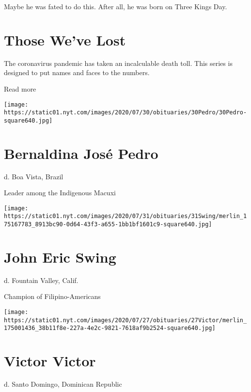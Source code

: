 Maybe he was fated to do this. After all, he was born on Three Kings
Day.

\href{https://www.nytimes.com/interactive/2020/obituaries/people-died-coronavirus-obituaries.html?action=click\&pgtype=Article\&state=default\&region=BELOW_MAIN_CONTENT\&context=covid_obits_promo}{}

\hypertarget{those-weve-lost}{%
\section{Those We've Lost}\label{those-weve-lost}}

The coronavirus pandemic has taken an incalculable death toll. This
series is designed to put names and faces to the numbers.

Read more

\texttt{[image: https://static01.nyt.com/images/2020/07/30/obituaries/30Pedro/30Pedro-square640.jpg]}

\hypertarget{bernaldina-josuxe9-pedro}{%
\section{Bernaldina José Pedro}\label{bernaldina-josuxe9-pedro}}

d. Boa Vista, Brazil

Leader among the Indigenous Macuxi

\texttt{[image: https://static01.nyt.com/images/2020/07/31/obituaries/31Swing/merlin\_175167783\_8913bc90-0d64-43f3-a655-1bb1bf1601c9-square640.jpg]}

\hypertarget{john-eric-swing}{%
\section{John Eric Swing}\label{john-eric-swing}}

d. Fountain Valley, Calif.

Champion of Filipino-Americans

\texttt{[image: https://static01.nyt.com/images/2020/07/27/obituaries/27Victor/merlin\_175001436\_38b11f8e-227a-4e2c-9821-7618af9b2524-square640.jpg]}

\hypertarget{victor-victor}{%
\section{Victor Victor}\label{victor-victor}}

d. Santo Domingo, Dominican Republic

